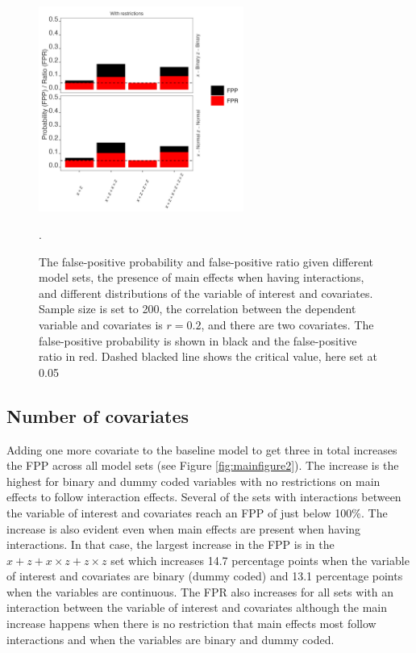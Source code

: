 \begin{figure}[hbt!]
\includegraphics[width=0.6\textwidth]{R/Analysis/Result/Figures/Figure1A_with.jpeg}
\centering
\caption{The false-positive probability and false-positive ratio given different model sets, the presence of main effects when having interactions, and different distributions of the variable of interest and covariates. Sample size is set to 200, the correlation between the dependent variable and covariates is $r=0.2$, and there are two covariates. The false-positive probability is shown in black and the false-positive ratio in red. Dashed blacked line shows the critical value, here set at 0.05 }.
\label{fig:mainfigure1}
\end{figure}

\subsection{Number of covariates}
Adding one more covariate to the baseline model to get three in total increases the FPP across all model sets (see Figure \ref{fig:mainfigure2}). The increase is the highest for binary and dummy coded variables with no restrictions on main effects to follow interaction effects. Several of the sets with interactions between the variable of interest and covariates reach an FPP of just below 100\%. The increase is also evident even when main effects are present when having interactions. In that case, the largest increase in the FPP is in the $x + z+ x \times z + z \times z$ set which increases 14.7 percentage points when the variable of interest and covariates are binary (dummy coded) and 13.1 percentage points when the variables are continuous. The FPR also increases for all sets with an interaction between the variable of interest and covariates although the main increase happens when there is no restriction that main effects most follow interactions and when the variables are binary and dummy coded.

